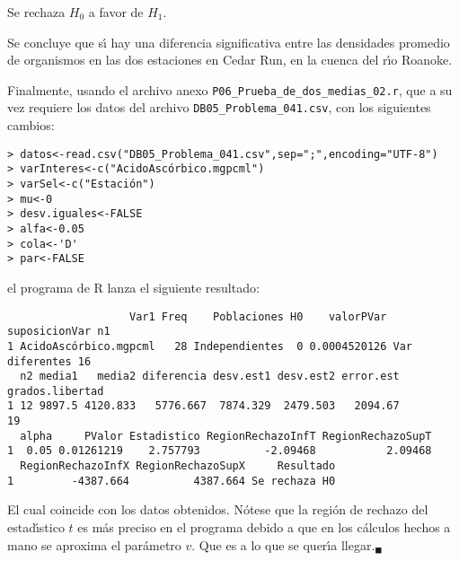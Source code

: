 \begin{solucion}
 \begin{decision}
  Se rechaza $H_0$ a favor de $H_1$.
 \end{decision}

 \begin{conclusion}
  Se concluye que s\'{\i} hay una diferencia significativa
  entre las densidades promedio de organismos
  en las dos estaciones en Cedar Run,
  en la cuenca del r\'{\i}o Roanoke.  
 \end{conclusion}

 Finalmente, usando el archivo anexo
 \texttt{P06\_Prueba\_de\_dos\_medias\_02.r},
 que a su vez requiere los datos del archivo
 \texttt{DB05\_Problema\_041.csv},
 con los siguientes cambios:
 \begin{verbatim}
> datos<-read.csv("DB05_Problema_041.csv",sep=";",encoding="UTF-8")
> varInteres<-c("AcidoAscórbico.mgpcml")
> varSel<-c("Estación")
> mu<-0
> desv.iguales<-FALSE
> alfa<-0.05
> cola<-'D'
> par<-FALSE
 \end{verbatim}
 \vspace{-0.5cm}
 el programa de R lanza el siguiente resultado:
 \begin{verbatim}
                   Var1 Freq    Poblaciones H0    valorPVar  suposicionVar n1
1 AcidoAscórbico.mgpcml   28 Independientes  0 0.0004520126 Var diferentes 16
  n2 media1   media2 diferencia desv.est1 desv.est2 error.est grados.libertad
1 12 9897.5 4120.833   5776.667  7874.329  2479.503   2094.67              19
  alpha     PValor Estadistico RegionRechazoInfT RegionRechazoSupT
1  0.05 0.01261219    2.757793          -2.09468           2.09468
  RegionRechazoInfX RegionRechazoSupX     Resultado
1         -4387.664          4387.664 Se rechaza H0
 \end{verbatim}
 \vspace{-0.5cm}
 El cual coincide con los datos obtenidos.
 N\'otese que la regi\'on de rechazo del estad\'{\i}stico $t$
 es m\'as preciso en el programa
 debido a que en los c\'alculos hechos a mano se aproxima
 el par\'ametro $v$.
 Que es a lo que se quer\'{\i}a llegar.${}_{\blacksquare}$
\end{solucion}
